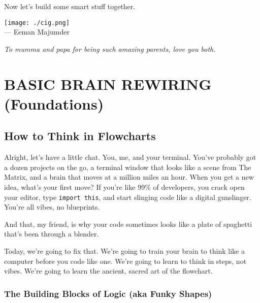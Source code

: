 \documentclass[11pt, letterpaper, openany]{book}
\begin{document}
Now let’s build some smart stuff together.



\begin{flushleft}
\texttt{[image: ./cig.png]} \\
— Eeman Majumder
\end{flushleft}

\clearpage
\thispagestyle{empty}
\vspace*{\fill}
\begin{center}
\textit{To mumma and papa for being such amazing parents, love you both.}
\end{center}
\vspace*{\fill}

\tableofcontents

\part{BASIC BRAIN REWIRING (Foundations)}

\chapter{How to Think in Flowcharts}

Alright, let's have a little chat. You, me, and your terminal. You've probably got a dozen projects on the go, a terminal window that looks like a scene from The Matrix, and a brain that moves at a million miles an hour. When you get a new idea, what's your first move? If you're like 99\% of developers, you crack open your editor, type \texttt{import this}, and start slinging code like a digital gunslinger. You're all vibes, no blueprints.

And that, my friend, is why your code sometimes looks like a plate of spaghetti that's been through a blender.

Today, we're going to fix that. We're going to train your brain to think like a computer before you code like one. We're going to learn to think in steps, not vibes. We're going to learn the ancient, sacred art of the flowchart.

\section{The Building Blocks of Logic (aka Funky Shapes)}
\end{document}
